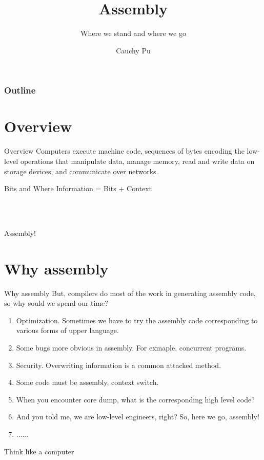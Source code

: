 \documentclass[UKenglish]{beamer}
\author{Cauchy Pu}
\title{Assembly}
\subtitle{Where we stand and where we go}
\begin{document}
%
%

\begin{frame}
\frametitle{Outline}
\tableofcontents
\end{frame}

\section{Overview}
\begin{frame}{Overview}
  Computers execute machine code, sequences of bytes encoding the low-level operations
  that manipulate data, manage memory, read and write data on storage devices, and
  communicate over networks.

  \begin{alertblock}{Bits and Where}
   Information = Bits + Context
 \end{alertblock}

 \begin{center}
   \\ \\
 \end{center}

 \begin{center}
   \vspace{1cm}
   \Huge Assembly!
 \end{center}
\end{frame}


\section{Why assembly}
\begin{frame}{Why assembly}
  But, compilers do most of the work in generating assembly code, so why sould we spend
  our time?
  \begin{enumerate}
  \item Optimization. Sometimes we have to try the assembly code corresponding to various
    forms of upper language.
  \item Some bugs more obvious in assembly. For exmaple, concurrent programs.
  \item Security. Overwriting information is a common attacked method.
  \item Some code must be assembly, context switch.
  \item When you encounter core dump, what is the corresponding high level code?
  \item And you told me, we are low-level engineers, right? So, here we go, assembly!
  \item ......
  \end{enumerate}
   \begin{center}
   \Huge Think like a computer
 \end{center}
\end{frame}
\end{document}
